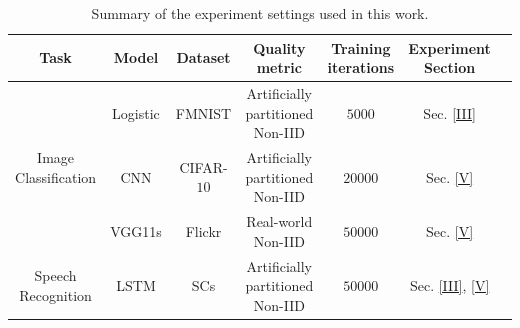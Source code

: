 
\begin{table}[!th]
\caption{Summary of the experiment settings used in this work.}
\label{table:1}
\centering
\begin{threeparttable}
\begin{tabular}{ccccccc}
   \toprule
   Task & Model  & Dataset & Quality metric &  Training iterations & Experiment Section \\
   \midrule
   \multirow{3}{*}{Image Classification} &   Logistic%
   & FMNIST \cite{fmnist}  & Artificially partitioned Non-IID & $5000$ & Sec. \ref{III}\\
    &   CNN%
   & CIFAR-$10$ 
   \cite{cifar10} & Artificially partitioned Non-IID &  $20000$ & Sec. \ref{V}\\
   &    VGG11s & Flickr \cite{niid2020icml} & Real-world Non-IID & $50000$ & Sec. \ref{V} \\
   \midrule
   Speech Recognition &   LSTM &  SCs\cite{warden2018speech} & Artificially partitioned Non-IID &   $50000$ & Sec. \ref{III}, \ref{V} \\
   \bottomrule
   
\end{tabular}

\end{threeparttable}
\label{benchmark}
\end{table}
 

